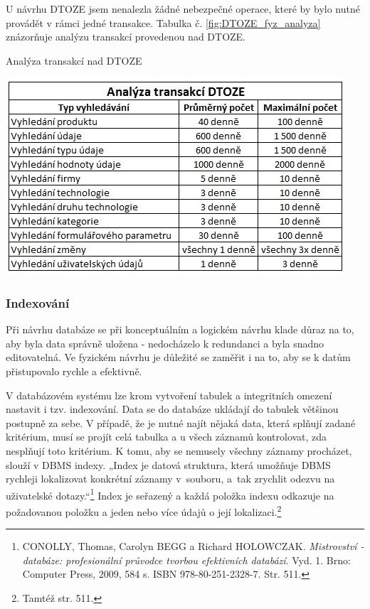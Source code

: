 \documentclass[11pt,a4paper]{article}
\begin{document}
U návrhu DTOZE jsem nenalezla žádné nebezpečné operace, které by bylo nutné provádět v rámci jedné transakce. Tabulka č. \ref{fig:DTOZE_fyz_analyza} znázorňuje analýzu transakcí provedenou nad DTOZE. 
\vspace{0.5cm}
\begin{table}[H] 
\centering 
\caption{Analýza transakcí nad DTOZE} 
\includegraphics[scale=0.6]{DTOZE_fyz_analyza} 
\label{fig:DTOZE_fyz_analyza}
\end{table} 
\vspace{0.5cm}

\subsubsection{Indexování}
Při návrhu databáze se při konceptuálním a logickém návrhu klade důraz na to, aby byla data správně uložena - nedocházelo k redundanci a byla snadno editovatelná. Ve fyzickém návrhu je důležité se zaměřit i na to, aby se k datům přistupovalo rychle a efektivně.

V databázovém systému lze krom vytvoření tabulek a integritních omezení nastavit i tzv. indexování. Data se do databáze ukládají do tabulek většinou postupně za sebe. V případě, že je nutné najít nějaká data, která splňují zadané kritérium, musí se projít celá tabulka a u všech záznamů kontrolovat, zda nesplňují toto kritérium. K tomu, aby se nemusely všechny záznamy procházet, slouží v DBMS indexy. „Index je datová struktura, která umožňuje DBMS rychleji lokalizovat konkrétní záznamy v~souboru, a~tak zrychlit odezvu na uživatelské dotazy.“\footnote{CONOLLY, Thomas, Carolyn BEGG a Richard HOLOWCZAK. \textit{Mistrovství - databáze: profesionální průvodce tvorbou efektivních databází}. Vyd. 1. Brno: Computer Press, 2009, 584 s. ISBN 978-80-251-2328-7. Str. 511.} Index je seřazený a každá položka indexu odkazuje na požadovanou položku a jeden nebo více údajů o její lokalizaci.\footnote{Tamtéž str. 511.}
\end{document}
